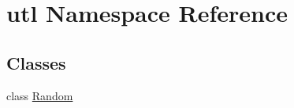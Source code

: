 \hypertarget{namespaceutl}{}\section{utl Namespace Reference}
\label{namespaceutl}
\subsection*{Classes}
\begin{DoxyCompactItemize}
\item 
class \mbox{\hyperlink{classutl_1_1_random}{Random}}
\end{DoxyCompactItemize}
